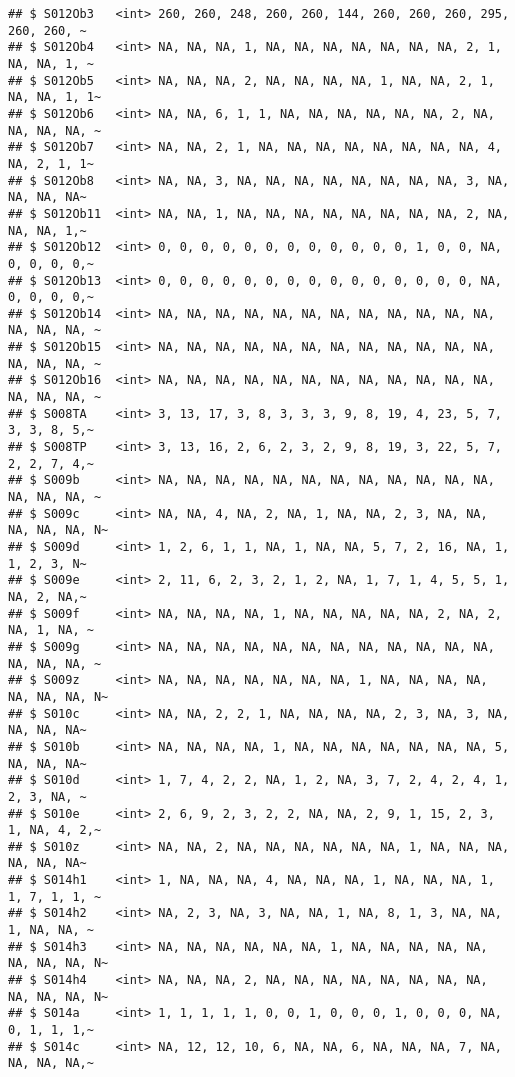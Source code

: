 \documentclass[
]{article}
\begin{document}
\begin{verbatim}
## $ S012Ob3   <int> 260, 260, 248, 260, 260, 144, 260, 260, 260, 295, 260, 260, ~
## $ S012Ob4   <int> NA, NA, NA, 1, NA, NA, NA, NA, NA, NA, NA, 2, 1, NA, NA, 1, ~
## $ S012Ob5   <int> NA, NA, NA, 2, NA, NA, NA, NA, 1, NA, NA, 2, 1, NA, NA, 1, 1~
## $ S012Ob6   <int> NA, NA, 6, 1, 1, NA, NA, NA, NA, NA, NA, 2, NA, NA, NA, NA, ~
## $ S012Ob7   <int> NA, NA, 2, 1, NA, NA, NA, NA, NA, NA, NA, NA, 4, NA, 2, 1, 1~
## $ S012Ob8   <int> NA, NA, 3, NA, NA, NA, NA, NA, NA, NA, NA, 3, NA, NA, NA, NA~
## $ S012Ob11  <int> NA, NA, 1, NA, NA, NA, NA, NA, NA, NA, NA, 2, NA, NA, NA, 1,~
## $ S012Ob12  <int> 0, 0, 0, 0, 0, 0, 0, 0, 0, 0, 0, 0, 1, 0, 0, NA, 0, 0, 0, 0,~
## $ S012Ob13  <int> 0, 0, 0, 0, 0, 0, 0, 0, 0, 0, 0, 0, 0, 0, 0, NA, 0, 0, 0, 0,~
## $ S012Ob14  <int> NA, NA, NA, NA, NA, NA, NA, NA, NA, NA, NA, NA, NA, NA, NA, ~
## $ S012Ob15  <int> NA, NA, NA, NA, NA, NA, NA, NA, NA, NA, NA, NA, NA, NA, NA, ~
## $ S012Ob16  <int> NA, NA, NA, NA, NA, NA, NA, NA, NA, NA, NA, NA, NA, NA, NA, ~
## $ S008TA    <int> 3, 13, 17, 3, 8, 3, 3, 3, 9, 8, 19, 4, 23, 5, 7, 3, 3, 8, 5,~
## $ S008TP    <int> 3, 13, 16, 2, 6, 2, 3, 2, 9, 8, 19, 3, 22, 5, 7, 2, 2, 7, 4,~
## $ S009b     <int> NA, NA, NA, NA, NA, NA, NA, NA, NA, NA, NA, NA, NA, NA, NA, ~
## $ S009c     <int> NA, NA, 4, NA, 2, NA, 1, NA, NA, 2, 3, NA, NA, NA, NA, NA, N~
## $ S009d     <int> 1, 2, 6, 1, 1, NA, 1, NA, NA, 5, 7, 2, 16, NA, 1, 1, 2, 3, N~
## $ S009e     <int> 2, 11, 6, 2, 3, 2, 1, 2, NA, 1, 7, 1, 4, 5, 5, 1, NA, 2, NA,~
## $ S009f     <int> NA, NA, NA, NA, 1, NA, NA, NA, NA, NA, 2, NA, 2, NA, 1, NA, ~
## $ S009g     <int> NA, NA, NA, NA, NA, NA, NA, NA, NA, NA, NA, NA, NA, NA, NA, ~
## $ S009z     <int> NA, NA, NA, NA, NA, NA, NA, 1, NA, NA, NA, NA, NA, NA, NA, N~
## $ S010c     <int> NA, NA, 2, 2, 1, NA, NA, NA, NA, 2, 3, NA, 3, NA, NA, NA, NA~
## $ S010b     <int> NA, NA, NA, NA, 1, NA, NA, NA, NA, NA, NA, NA, 5, NA, NA, NA~
## $ S010d     <int> 1, 7, 4, 2, 2, NA, 1, 2, NA, 3, 7, 2, 4, 2, 4, 1, 2, 3, NA, ~
## $ S010e     <int> 2, 6, 9, 2, 3, 2, 2, NA, NA, 2, 9, 1, 15, 2, 3, 1, NA, 4, 2,~
## $ S010z     <int> NA, NA, 2, NA, NA, NA, NA, NA, NA, 1, NA, NA, NA, NA, NA, NA~
## $ S014h1    <int> 1, NA, NA, NA, 4, NA, NA, NA, 1, NA, NA, NA, 1, 1, 7, 1, 1, ~
## $ S014h2    <int> NA, 2, 3, NA, 3, NA, NA, 1, NA, 8, 1, 3, NA, NA, 1, NA, NA, ~
## $ S014h3    <int> NA, NA, NA, NA, NA, NA, 1, NA, NA, NA, NA, NA, NA, NA, NA, N~
## $ S014h4    <int> NA, NA, NA, 2, NA, NA, NA, NA, NA, NA, NA, NA, NA, NA, NA, N~
## $ S014a     <int> 1, 1, 1, 1, 1, 0, 0, 1, 0, 0, 0, 1, 0, 0, 0, NA, 0, 1, 1, 1,~
## $ S014c     <int> NA, 12, 12, 10, 6, NA, NA, 6, NA, NA, NA, 7, NA, NA, NA, NA,~

\end{verbatim}
\end{document}
